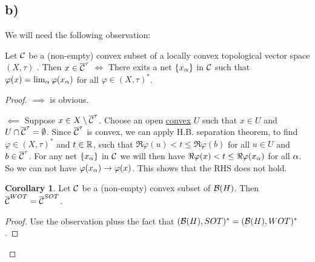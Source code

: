 \documentclass[10pt,english,a4paper]{article}
\theoremstyle{definition}
\newtheorem*{corollary}{Corollary}
\def\vphi{\varphi}
\begin{document}
\subsection*{b)}
We will need the following observation:

Let $\mathcal{C}$ be a (non-empty) convex subset of a locally convex topological 
vector space $(X,\tau)$ .
Then $x \in \overline{\mathcal{C}}^{\tau} $ $\iff$ There exits a net $\{x_{\alpha}\}$
in $\mathcal{C}$ such that $\vphi(x) = \lim_{\al}\vphi(x_{\al})$ for all $\vphi \in (X,\tau)^*$.

\begin{proof}
    $\implies $ is obvious. 

$\impliedby$ Suppose $x \in X\setminus \overline{\mathcal{C}}^{\tau}$. Choose an open \ul{convex}
$U$ such that $x \in  U$ and $U\cap \overline{\mathcal{C}}^{\tau} = \emptyset$. Since 
$\overline{\mathcal{C}}^{\tau}$ is convex, we can apply H.B. separation theorem, to find 
$\vphi \in (X,\tau)^*$ and $t \in \mathbb{R}$, such that 
$\Re\vphi(u)< t \leq \Re\vphi(b)$ for all $u \in U$ and $b \in \overline{\mathcal{C}}^{\tau}$.
For any net $\{x_{\alpha}\}$ in $\mathcal{C}$ we will then have $\Re\vphi(x) < t \leq \Re\vphi(x_{\al})$
for all $\alpha$. So we can not have $\vphi(x_{\al})\to\vphi(x)$. This shows that 
the RHS does not hold. 

\begin{corollary}
    Let $\mathcal{C}$ be a (non-empty) convex subset of $\mathcal{B}(H)$. 
Then $\overline{\mathcal{C}}^{WOT} = \overline{\mathcal{C}}^{SOT}$.
\end{corollary}
\begin{proof}
    Use the observation pluss the fact that 
$(\mathcal{B}(H), SOT)^* = (\mathcal{B}(H), WOT)^*$.
\end{proof}


















\end{proof}
\end{document}
